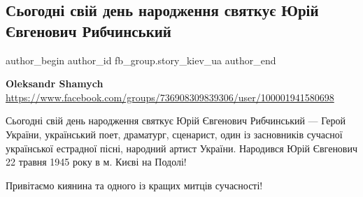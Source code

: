  
 
 
 
 
 
\subsection{Сьогодні свій день народження святкує Юрій Євгенович Рибчинський}
\label{sec:23_05_2021.fb.fb_group.story_kiev_ua.2.rybchynskij_jurij_poet}
\ifcmt
 author_begin
   author_id fb_group.story_kiev_ua
 author_end
\fi

\textbf{Oleksandr Shamych}
\url{https://www.facebook.com/groups/736908309839306/user/100001941580698}

Сьогодні свій день народження святкує Юрій Євгенович Рибчинський  — Герой
України, український поет, драматург, сценарист, один із засновників сучасної
української естрадної пісні, народний артист України. Народився Юрій Євгенович
22 травня 1945 року в м. Києві на Подолі! 

Привітаємо киянина та одного із кращих митців сучасності!
